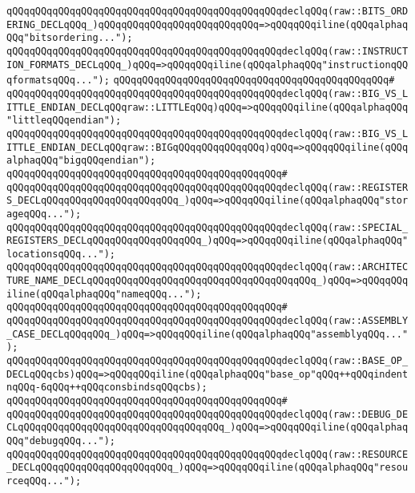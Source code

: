 \verb|qQQqqQQqqQQqqQQqqQQqqQQqqQQqqQQqqQQqqQQqqQQqqQQqdeclqQQq(raw::BITS_ORDERING_DECLqQQq_)qQQqqQQqqQQqqQQqqQQqqQQqqQQq=>qQQqqQQqiline(qQQqalphaqQQq"bitsordering...");|\newline
\verb|qQQqqQQqqQQqqQQqqQQqqQQqqQQqqQQqqQQqqQQqqQQqqQQqdeclqQQq(raw::INSTRUCTION_FORMATS_DECLqQQq_)qQQq=>qQQqqQQqiline(qQQqalphaqQQq"instructionqQQqformatsqQQq...");|\newline
\verb|qQQqqQQqqQQqqQQqqQQqqQQqqQQqqQQqqQQqqQQqqQQqqQQq#|\newline
\verb|qQQqqQQqqQQqqQQqqQQqqQQqqQQqqQQqqQQqqQQqqQQqqQQqdeclqQQq(raw::BIG_VS_LITTLE_ENDIAN_DECLqQQqraw::LITTLEqQQq)qQQq=>qQQqqQQqiline(qQQqalphaqQQq"littleqQQqendian");|\newline
\verb|qQQqqQQqqQQqqQQqqQQqqQQqqQQqqQQqqQQqqQQqqQQqqQQqdeclqQQq(raw::BIG_VS_LITTLE_ENDIAN_DECLqQQqraw::BIGqQQqqQQqqQQqqQQq)qQQq=>qQQqqQQqiline(qQQqalphaqQQq"bigqQQqendian");|\newline
\verb|qQQqqQQqqQQqqQQqqQQqqQQqqQQqqQQqqQQqqQQqqQQqqQQq#|\newline
\verb|qQQqqQQqqQQqqQQqqQQqqQQqqQQqqQQqqQQqqQQqqQQqqQQqdeclqQQq(raw::REGISTERS_DECLqQQqqQQqqQQqqQQqqQQqqQQq_)qQQq=>qQQqqQQqiline(qQQqalphaqQQq"storageqQQq...");|\newline
\verb|qQQqqQQqqQQqqQQqqQQqqQQqqQQqqQQqqQQqqQQqqQQqqQQqdeclqQQq(raw::SPECIAL_REGISTERS_DECLqQQqqQQqqQQqqQQqqQQq_)qQQq=>qQQqqQQqiline(qQQqalphaqQQq"locationsqQQq...");|\newline
\verb|qQQqqQQqqQQqqQQqqQQqqQQqqQQqqQQqqQQqqQQqqQQqqQQqdeclqQQq(raw::ARCHITECTURE_NAME_DECLqQQqqQQqqQQqqQQqqQQqqQQqqQQqqQQqqQQqqQQq_)qQQq=>qQQqqQQqiline(qQQqalphaqQQq"nameqQQq...");|\newline
\verb|qQQqqQQqqQQqqQQqqQQqqQQqqQQqqQQqqQQqqQQqqQQqqQQq#|\newline
\verb|qQQqqQQqqQQqqQQqqQQqqQQqqQQqqQQqqQQqqQQqqQQqqQQqdeclqQQq(raw::ASSEMBLY_CASE_DECLqQQqqQQq_)qQQq=>qQQqqQQqiline(qQQqalphaqQQq"assemblyqQQq...");|\newline
\verb|qQQqqQQqqQQqqQQqqQQqqQQqqQQqqQQqqQQqqQQqqQQqqQQqdeclqQQq(raw::BASE_OP_DECLqQQqcbs)qQQq=>qQQqqQQqiline(qQQqalphaqQQq"base_op"qQQq++qQQqindentnqQQq-6qQQq++qQQqconsbindsqQQqcbs);|\newline
\verb|qQQqqQQqqQQqqQQqqQQqqQQqqQQqqQQqqQQqqQQqqQQqqQQq#|\newline
\verb|qQQqqQQqqQQqqQQqqQQqqQQqqQQqqQQqqQQqqQQqqQQqqQQqdeclqQQq(raw::DEBUG_DECLqQQqqQQqqQQqqQQqqQQqqQQqqQQqqQQqqQQq_)qQQq=>qQQqqQQqiline(qQQqalphaqQQq"debugqQQq...");|\newline
\verb|qQQqqQQqqQQqqQQqqQQqqQQqqQQqqQQqqQQqqQQqqQQqqQQqdeclqQQq(raw::RESOURCE_DECLqQQqqQQqqQQqqQQqqQQqqQQq_)qQQq=>qQQqqQQqiline(qQQqalphaqQQq"resourceqQQq...");|\newline
